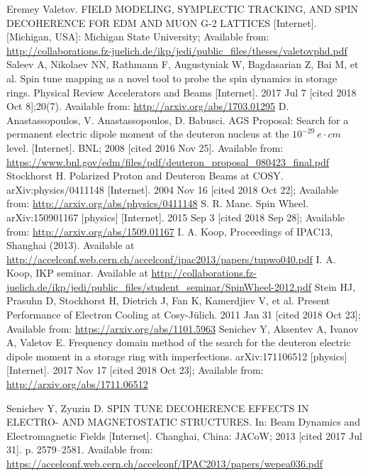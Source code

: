 \documentclass{article}
\begin{document}
\begin{thebibliography}{99}
  Eremey Valetov. FIELD MODELING, SYMPLECTIC TRACKING, AND SPIN DECOHERENCE FOR EDM AND MUON G-2 LATTICES [Internet]. [Michigan, USA]: Michigan State University; Available from: \url{http://collaborations.fz-juelich.de/ikp/jedi/public_files/theses/valetovphd.pdf}
  Saleev A, Nikolaev NN, Rathmann F, Augustyniak W, Bagdasarian Z, Bai M, et al. Spin tune mapping as a novel tool to probe the spin dynamics in storage rings. Physical Review Accelerators and Beams [Internet]. 2017 Jul 7 [cited 2018 Oct 8];20(7). Available from: \url{http://arxiv.org/abs/1703.01295}
  D. Anastassopoulos, V. Anastassopoulos, D. Babusci. AGS Proposal: Search for a permanent electric dipole moment of the deuteron nucleus at the $10^{−29}~e\cdot cm$ level. [Internet]. BNL; 2008 [cited 2016 Nov 25]. Available from: \url{https://www.bnl.gov/edm/files/pdf/deuteron_proposal_080423_final.pdf}
  Stockhorst H. Polarized Proton and Deuteron Beams at COSY. arXiv:physics/0411148 [Internet]. 2004 Nov 16 [cited 2018 Oct 22]; Available from: \url{http://arxiv.org/abs/physics/0411148}
  S. R. Mane. Spin Wheel. arXiv:150901167 [physics] [Internet]. 2015 Sep 3 [cited 2018 Sep 28]; Available from: \url{http://arxiv.org/abs/1509.01167}
  I. A. Koop, Proceedings of IPAC13, Shanghai (2013). Available at \url{http://accelconf.web.cern.ch/accelconf/ipac2013/papers/tupwo040.pdf}
  I. A. Koop, IKP seminar. Available at \url{http://collaborations.fz-juelich.de/ikp/jedi/public_files/student_seminar/SpinWheel-2012.pdf}
  Stein HJ, Prasuhn D, Stockhorst H, Dietrich J, Fan K, Kamerdjiev V, et al. Present Performance of Electron Cooling at Cosy-J\"ulich. 2011 Jan 31 [cited 2018 Oct 23]; Available from: \url{https://arxiv.org/abs/1101.5963}
  Senichev Y, Aksentev A, Ivanov A, Valetov E. Frequency domain method of the search for the deuteron electric dipole moment in a storage ring with imperfections. arXiv:171106512 [physics] [Internet]. 2017 Nov 17 [cited 2018 Oct 23]; Available from: \url{http://arxiv.org/abs/1711.06512}

  Senichev Y, Zyuzin D. SPIN TUNE DECOHERENCE EFFECTS IN ELECTRO- AND  MAGNETOSTATIC STRUCTURES. In: Beam Dynamics and Electromagnetic Fields [Internet]. Changhai, China: JACoW; 2013 [cited 2017 Jul 31]. p. 2579--2581. Available from: \url{https://accelconf.web.cern.ch/accelconf/IPAC2013/papers/wepea036.pdf}



\end{thebibliography}
\end{document}
